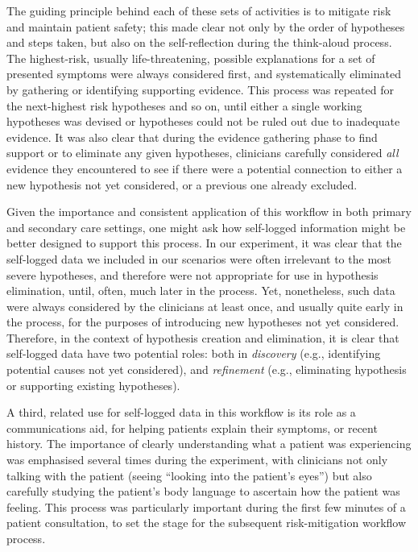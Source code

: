 \documentclass{sigchi}
\begin{document}
The guiding principle behind each of these sets of activities is to mitigate risk and maintain patient safety;  this made clear not only by the order of hypotheses and steps taken, but also on the self-reflection during the think-aloud process. The highest-risk, usually life-threatening, possible explanations for a set of presented symptoms were always considered first, and systematically eliminated by gathering or identifying supporting evidence.  This process was repeated for the next-highest risk hypotheses and so on, until either a single working hypotheses was devised or hypotheses could not be ruled out due to inadequate evidence. It was also clear that during the evidence gathering phase to find support or to eliminate any given hypotheses, clinicians carefully considered \emph{all} evidence they encountered to see if there were a potential connection to either a new hypothesis not yet considered, or a previous one already excluded.

Given the importance and consistent application of this workflow in both primary and secondary care settings, one might ask how self-logged information might be better designed to support this process. In our experiment, it was clear that the self-logged data we included in our scenarios were often irrelevant to the most severe hypotheses, and therefore were not appropriate for use in hypothesis elimination, until, often, much later in the process.  Yet, nonetheless, such data were always considered by the clinicians at least once, and usually quite early in the process, for the purposes of introducing new hypotheses not yet considered.  Therefore, in the context of hypothesis creation and elimination, it is clear that self-logged data have two potential roles: both in \emph{discovery} (e.g., identifying potential causes not yet considered), and \emph{refinement} (e.g., eliminating hypothesis or supporting existing hypotheses).

A third, related use for self-logged data in this workflow is its role as a communications aid, for helping patients explain their symptoms, or recent history.  The importance of clearly understanding what a patient was experiencing was emphasised several times during the experiment, with clinicians not only talking with the patient (seeing ``looking into the patient's eyes'') but also carefully studying the patient's body language to ascertain how the patient was feeling.  This process was particularly important during the first few minutes of a patient consultation, to set the stage for the subsequent risk-mitigation workflow process.
\end{document}
